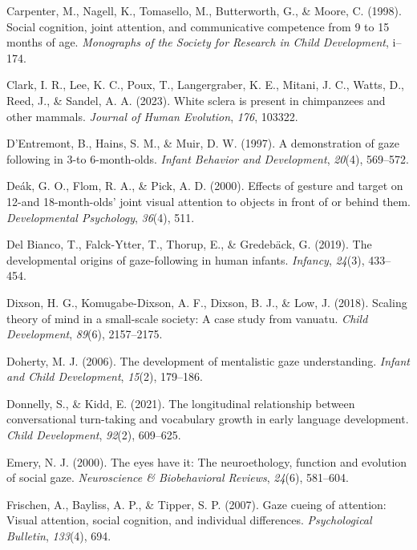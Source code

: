 \documentclass[
  man,floatsintext]{apa7}
\newlength{\cslhangindent}
\newenvironment{CSLReferences}[2] %
 {\begin{list}{}{%
  \setlength{\itemindent}{0pt}
  \setlength{\leftmargin}{0pt}
  \setlength{\parsep}{0pt}
  \ifodd #1
   \setlength{\leftmargin}{\cslhangindent}
   \setlength{\itemindent}{-1\cslhangindent}
  \fi
  \setlength{\itemsep}{#2\baselineskip}}}
 {\end{list}}
\begin{document}
\begin{CSLReferences}{1}{0}
Carpenter, M., Nagell, K., Tomasello, M., Butterworth, G., \& Moore, C. (1998). Social cognition, joint attention, and communicative competence from 9 to 15 months of age. \emph{Monographs of the Society for Research in Child Development}, i--174.

Clark, I. R., Lee, K. C., Poux, T., Langergraber, K. E., Mitani, J. C., Watts, D., Reed, J., \& Sandel, A. A. (2023). White sclera is present in chimpanzees and other mammals. \emph{Journal of Human Evolution}, \emph{176}, 103322.

D'Entremont, B., Hains, S. M., \& Muir, D. W. (1997). A demonstration of gaze following in 3-to 6-month-olds. \emph{Infant Behavior and Development}, \emph{20}(4), 569--572.

Deák, G. O., Flom, R. A., \& Pick, A. D. (2000). Effects of gesture and target on 12-and 18-month-olds' joint visual attention to objects in front of or behind them. \emph{Developmental Psychology}, \emph{36}(4), 511.

Del Bianco, T., Falck-Ytter, T., Thorup, E., \& Gredebäck, G. (2019). The developmental origins of gaze-following in human infants. \emph{Infancy}, \emph{24}(3), 433--454.

Dixson, H. G., Komugabe-Dixson, A. F., Dixson, B. J., \& Low, J. (2018). Scaling theory of mind in a small-scale society: A case study from vanuatu. \emph{Child Development}, \emph{89}(6), 2157--2175.

Doherty, M. J. (2006). The development of mentalistic gaze understanding. \emph{Infant and Child Development}, \emph{15}(2), 179--186.

Donnelly, S., \& Kidd, E. (2021). The longitudinal relationship between conversational turn-taking and vocabulary growth in early language development. \emph{Child Development}, \emph{92}(2), 609--625.

Emery, N. J. (2000). The eyes have it: The neuroethology, function and evolution of social gaze. \emph{Neuroscience \& Biobehavioral Reviews}, \emph{24}(6), 581--604.

Frischen, A., Bayliss, A. P., \& Tipper, S. P. (2007). Gaze cueing of attention: Visual attention, social cognition, and individual differences. \emph{Psychological Bulletin}, \emph{133}(4), 694.


\end{CSLReferences}
\end{document}
